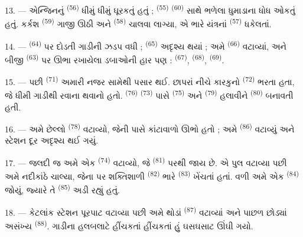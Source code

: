 13. --- એન્જિનનું  \textsuperscript{(56)} ધીમું ધીમું
ઘૂરકતું હતું ;  \textsuperscript{(55)} 
\textsuperscript{(60)} સાથે ભળેલા ધુમાડાના ધોધ ઓકતું હતું. કર્કશ
 \textsuperscript{(59)} ગાજી ઊઠી અને 
\textsuperscript{(58)} ચાલવા લાગ્યા, એ ભારે યંત્રનાં 
\textsuperscript{(57)} ધકેલતાં.

\VUsaut{3.0mm}
\VUsaut{3.0mm}

14. ---  \textsuperscript{(64)} પર દોડતી ગાડીની ઝડપ વધી ;
 \textsuperscript{(65)} અદૃશ્ય થયાં ; અમે
 \textsuperscript{(66)} વટાવ્યાં, અને બીજી
 \textsuperscript{(63)} પર ઊભા રખાયેલા ડબાઓની હાર પણ :
 \textsuperscript{(67)}, 
\textsuperscript{(68)},  \textsuperscript{(69)}.


15. --- પછી  \textsuperscript{(71)} અમારી નજર સામેથી
પસાર થઈ. છાપરાં નીચે કારકુનો  \textsuperscript{(72)} ભરતા
હતા, જે ધીમી ગાડીથી રવાના થવાનો હતો. 
\textsuperscript{(76)}  \textsuperscript{(73)} પાસે
 \textsuperscript{(75)} અને 
\textsuperscript{(79)} હલાવીને  \textsuperscript{(80)}
બનાવતી હતી.

16. --- અમે છેલ્લો  \textsuperscript{(78)} વટાવ્યો, જેની
પાસે કાંટાવાળો ઊભો હતો ; અમે  \textsuperscript{(86)}
વટાવ્યું અને સ્ટેશન દૂર અદૃશ્ય થઈ ગયું.

17. --- જલદી જ અમે એક  \textsuperscript{(74)}
વટાવ્યો, જે  \textsuperscript{(81)} પરથી જાય છે. એ પુલ
વટાવ્યા પછી અમે નદીકાંઠે ચાલ્યા, જેના પર શક્તિશાળી  \textsuperscript{(82)} ભારે 
\textsuperscript{(83)} ખેંચતાં હતાં. વળી અમે એક 
\textsuperscript{(84)} જોયું, જ્યારે તે 
\textsuperscript{(85)} અડી રહ્યું હતું.

18. --- કેટલાંક સ્ટેશન પૂરપાટ વટાવ્યા પછી અમે થોડાં 
\textsuperscript{(87)} વટાવ્યાં અને પાછળ છોડ્યાં 
અસંખ્ય  \textsuperscript{(88)}. ગાડીના હલબલાટે
હીંચકતાં હીંચકતાં હું ઘસઘસાટ ઊંઘી ગયો.


